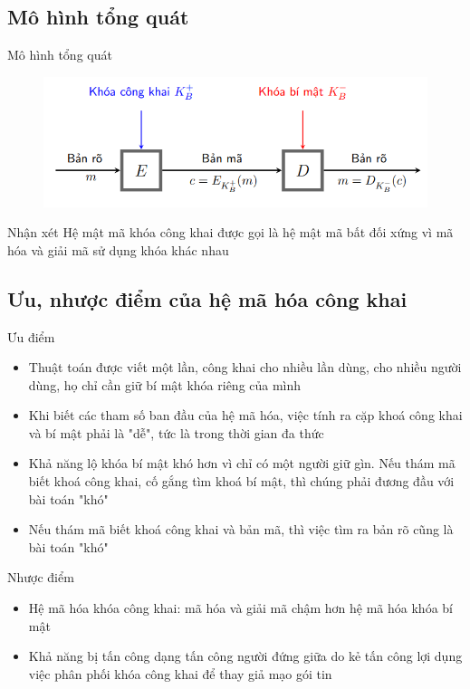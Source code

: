 \documentclass{beamer}
\begin{document}
\subsection{Mô hình tổng quát}
\begin{frame}{Mô hình tổng quát}
\begin{figure}[H]
\centering
\includegraphics[scale = 0.6]{pictures/mo_hinh_tong_quat.png}
\end{figure}

\begin{block}{Nhận xét}
Hệ mật mã khóa công khai được gọi là hệ mật mã bất đối xứng vì mã hóa và giải mã sử dụng khóa khác nhau
\end{block}
\end{frame}
\subsection{Ưu, nhược điểm của hệ mã hóa công khai}
\begin{frame}{Ưu điểm}
\begin{itemize}
\item Thuật toán được viết một lần, công khai cho nhiều lần dùng, cho nhiều người dùng, họ chỉ cần giữ bí mật khóa riêng của mình
\item Khi biết các tham số ban đầu của hệ mã hóa, việc tính ra cặp khoá công khai và bí mật phải là "dễ", tức là trong thời gian đa thức
\item Khả năng lộ khóa bí mật khó hơn vì chỉ có một người giữ gìn. Nếu thám mã biết khoá công khai, cố gắng tìm khoá bí mật, thì chúng phải đương đầu với bài toán "khó"
\item Nếu thám mã biết khoá công khai và bản mã, thì việc tìm ra bản rõ cũng là bài toán "khó"
\end{itemize}
\end{frame}
\begin{frame}{Nhược điểm}
\begin{itemize}
\item Hệ mã hóa khóa công khai: mã hóa và giải mã chậm hơn hệ mã hóa khóa bí mật
\item Khả năng bị tấn công dạng tấn công người đứng giữa do kẻ tấn công lợi dụng việc phân phối khóa công khai để thay giả mạo gói tin
\end{itemize}
\end{frame}
\end{document}
